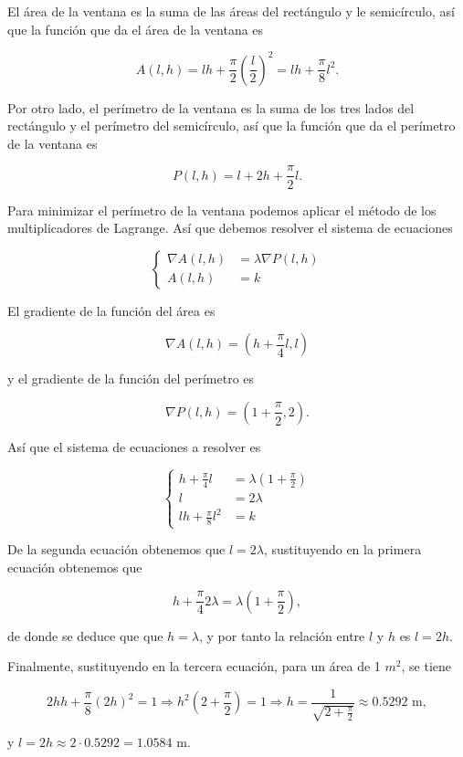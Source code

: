\documentclass[
  a4paper,
]{scrreport}
\theoremstyle{definition}
\theoremstyle{remark}
\begin{document}
\begin{tcolorbox}[enhanced jigsaw, opacityback=0, bottomtitle=1mm, coltitle=black, opacitybacktitle=0.6, colback=white, breakable, left=2mm, titlerule=0mm, bottomrule=.15mm, colbacktitle=quarto-callout-tip-color!10!white, toprule=.15mm, leftrule=.75mm, arc=.35mm, toptitle=1mm, colframe=quarto-callout-tip-color-frame, title=\textcolor{quarto-callout-tip-color}{\faLightbulb}\hspace{0.5em}{Solución}, rightrule=.15mm]

El área de la ventana es la suma de las áreas del rectángulo y le
semicírculo, así que la función que da el área de la ventana es

\[
A(l,h)=lh+\frac{\pi}{2}\left(\frac{l}{2}\right)^2 = lh + \frac{\pi}{8}l^2.
\]

Por otro lado, el perímetro de la ventana es la suma de los tres lados
del rectángulo y el perímetro del semicírculo, así que la función que da
el perímetro de la ventana es

\[
P(l,h)=l+2h+\frac{\pi}{2}l.
\]

Para minimizar el perímetro de la ventana podemos aplicar el método de
los multiplicadores de Lagrange. Así que debemos resolver el sistema de
ecuaciones

\[
\begin{cases}
\nabla A(l,h) &= \lambda \nabla P(l,h) \\
A(l,h) &= k
\end{cases}
\]

El gradiente de la función del área es

\[
\nabla A(l,h) = \left( h + \frac{\pi}{4}l,  l\right)
\]

y el gradiente de la función del perímetro es

\[
\nabla P(l,h) = \left( 1 + \frac{\pi}{2}, 2\right).
\]

Así que el sistema de ecuaciones a resolver es

\[
\begin{cases}
h + \frac{\pi}{4}l &= \lambda \left( 1 + \frac{\pi}{2}\right) \\
l &= 2\lambda \\
lh + \frac{\pi}{8}l^2 &= k
\end{cases}
\]

De la segunda ecuación obtenemos que \(l=2\lambda\), sustituyendo en la
primera ecuación obtenemos que

\[
h + \frac{\pi}{4}2\lambda = \lambda \left( 1 + \frac{\pi}{2}\right),
\]

de donde se deduce que que \(h = \lambda\), y por tanto la relación
entre \(l\) y \(h\) es \(l=2h\).

Finalmente, sustituyendo en la tercera ecuación, para un área de 1
\(m^2\), se tiene

\[
2hh + \frac{\pi}{8}(2h)^2 = 1 
\Rightarrow h^2\left( 2 + \frac{\pi}{2}\right) = 1 
\Rightarrow h = \frac{1}{\sqrt{2 + \frac{\pi}{2}}}
\approx 0.5292 \mbox{ m},
\]

y \(l = 2h \approx 2\cdot 0.5292 = 1.0584\) m.

\end{tcolorbox}
\end{document}
